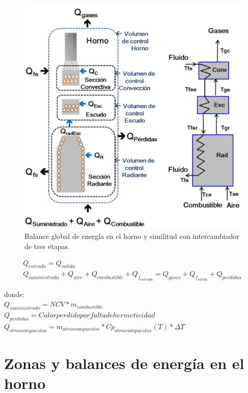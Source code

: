 \begin{figure}[hbt]
\begin{center}
\includegraphics[scale=0.38]{images/balance-energic}
\caption[Balance de energía del horno]{Balance global de energía en el horno y similitud con intercambiador de tres etapas.}
\label{fig:balance-energic}
\end{center}
\end{figure}

\begin{equation}
    \label{eq:balance-global}
    \begin{gathered}
    Q_{entrada} = Q_{salida}\\
    Q_{suministrado} + Q_{aire} + Q_{combustible} + Q_{f_{entrada}} = 
    Q_{gases} + Q_{f_{salida}} + Q_{perdidas}
    \end{gathered}
\end{equation}

donde:\\
$Q_{suministrado} = NCV * m_{combustible}$\\
$Q_{perdidas} = Calor perdido por falta de hermeticidad$\\
$Q_{otros compuestos} = m_{otros compuestos} * Cp_{otros compuestos}(T) * \Delta T$

\section{Zonas y balances de energía en el horno}

